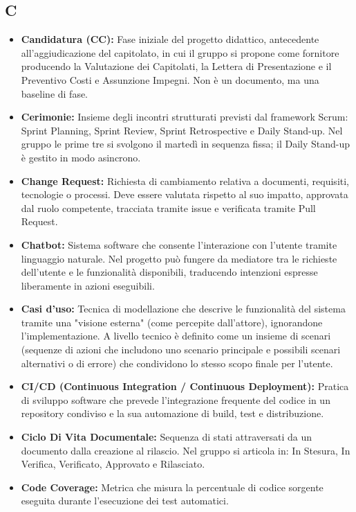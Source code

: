 \subsection*{C}
\begin{itemize}[leftmargin=*]
      \item \textbf{Candidatura (CC):} Fase iniziale del progetto didattico, antecedente all'aggiudicazione del capitolato, in cui il gruppo si propone come fornitore producendo la Valutazione dei Capitolati, la Lettera di Presentazione e il Preventivo Costi e Assunzione Impegni. Non è un documento, ma una baseline di fase.      
      \item \textbf{Cerimonie:} Insieme degli incontri strutturati previsti dal
      framework Scrum: Sprint Planning, Sprint Review, Sprint
      Retrospective e Daily Stand-up. Nel gruppo le prime tre si svolgono il martedì in sequenza fissa; il Daily Stand-up è gestito in modo asincrono.
      \item \textbf{Change Request:} Richiesta di cambiamento relativa a documenti, requisiti, tecnologie o processi. Deve essere valutata rispetto al suo impatto, approvata dal ruolo competente, tracciata tramite issue e verificata tramite Pull Request.
      \item \textbf{Chatbot:} Sistema software che consente l'interazione con l'utente tramite linguaggio naturale. Nel progetto può fungere da mediatore tra le richieste dell'utente e le funzionalità disponibili, traducendo intenzioni espresse liberamente in azioni eseguibili.
      \item \textbf{Casi d'uso:} Tecnica di modellazione che descrive le funzionalità del sistema tramite una "visione esterna" (come percepite dall'attore), ignorandone l'implementazione. A livello tecnico è definito come un insieme di scenari (sequenze di azioni che includono uno scenario principale e possibili scenari alternativi o di errore) che condividono lo stesso scopo finale per l'utente.
      \item  \textbf{CI/CD (Continuous Integration / Continuous Deployment):} Pratica di sviluppo software che prevede l’integrazione frequente del codice in un repository condiviso e la sua automazione di build, test e distribuzione.
      \item \textbf{Ciclo Di Vita Documentale:} Sequenza di stati attraversati da un documento dalla creazione al rilascio. Nel gruppo si articola in: In Stesura, In Verifica, Verificato, Approvato e Rilasciato.      \item \textbf{Code Coverage:} Metrica che misura la percentuale di codice sorgente eseguita durante l’esecuzione dei test automatici.

\end{itemize}

